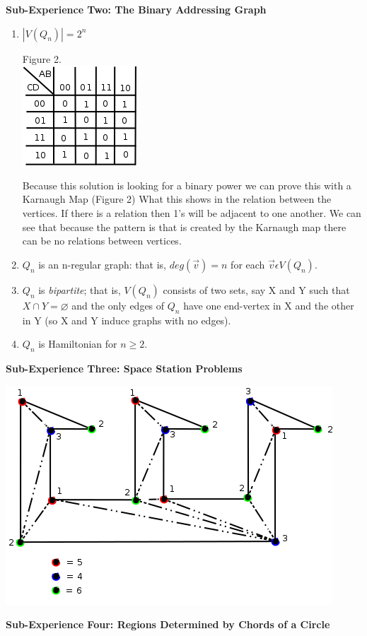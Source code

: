 \documentclass[10pt,a4paper]{report}
\begin{document}
	\textbf{Sub-Experience Two: The Binary Addressing Graph}
		\begin{enumerate}
			\item $|V(Q_n)| = 2^n$
			\begin{center}
				Figure 2.\\
				\includegraphics[scale=.5]{2_1.png}
			\end{center}
			Because this solution is looking for a binary power we can prove this with a Karnaugh Map (Figure 2) What this shows in the relation between the vertices.  If there is a relation then 1's will be adjacent to one another.  We can see that because the pattern is that is created by the Karnaugh map there can be no relations between vertices.
			\item $Q_n$ is an n-regular graph: that is, $deg (\vec{v}) = n $ for each $\vec{v} \epsilon V(Q_n)$.
			\item $Q_n$ is \textit{bipartite}; that is, $V(Q_n)$ consists of two sets, say X and Y such that $X\cap Y = \varnothing$ and the only edges of $Q_n$ have one end-vertex in X and the other in Y (so X and Y induce graphs with no edges).
			\item $Q_n$ is Hamiltonian for $n \geq 2$.
		\end{enumerate}
		
		
	\textbf{Sub-Experience Three: Space Station Problems}\\
	
		\begin{center}
			\includegraphics[scale=.5]{e3.png}
			\newline
			\newline
		\end{center}
	\textbf{Sub-Experience Four: Regions Determined by Chords of a Circle}\\
	
\end{document}
